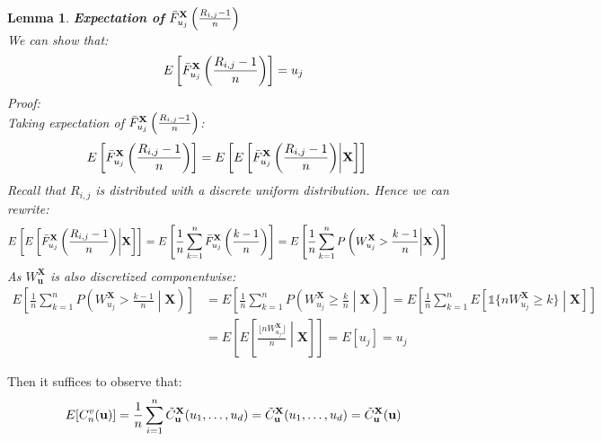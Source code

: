 \documentclass[12pt]{report}
\newtheorem{lemma}{Lemma}[subsection]
\newcommand{\1}{\mathbf{1}}
\begin{document}
\begin{flushleft}
\begin{lemma}\label{componentequalsu_j}
\textit{\normalfont\parencite{KojadinovicYi2024Smooth}}\:
\textbf{Expectation of} $\Bar{F}_{u_{j}}^{\textbf{X}}\left(\frac{R_{i,j} - 1}{n}\right)$ \\
We can show that: 
\begin{align*}
E \left[ \Bar{F}_{u_{j}}^{\textbf{X}}\left(\frac{R_{i,j} - 1}{n}\right) \right] = u_{j}
\end{align*}
Proof:\\
Taking expectation of $\Bar{F}_{u_{j}}^{\textbf{X}}\left(\frac{R_{i,j} - 1}{n}\right)$:
\begin{align*}
E \left[ \Bar{F}_{u_{j}}^{\textbf{X}}\left(\frac{R_{i,j} - 1}{n}\right) \right] &= E \left[ E \left[ \Bar{F}_{u_{j}}^{\textbf{X}}\left(\frac{R_{i,j} - 1}{n}\right) \middle| \textbf{X} \right] \right]
\end{align*}
Recall that $R_{i,j}$ is distributed with a discrete uniform distribution. Hence we can rewrite:
\begin{align*}
E \left[ E \left[ \Bar{F}_{u_{j}}^{\textbf{X}}\left(\frac{R_{i,j} - 1}{n}\right) \middle| \textbf{X} \right] \right] &= E \left[ \frac{1}{n} \sum\limits_{k = 1}^{n} \Bar{F}_{u_{j}}^{\textbf{X}}\left(\frac{k - 1}{n}\right) \right] = E \left[ \frac{1}{n} \sum\limits_{k = 1}^{n} P \left( W^{\textbf{X}}_{u_{j}} > \frac{k - 1}{n} \middle| \textbf{X} \right) \right]
\end{align*}
As $W^{\textbf{X}}_{\textbf{u}}$ is also discretized componentwise:
\begin{align*}
E \left[ \frac{1}{n} \sum\limits_{k = 1}^{n} P \left( W^{\textbf{X}}_{u_{j}} > \frac{k - 1}{n} \middle| \textbf{X} \right) \right] &= E \left[ \frac{1}{n} \sum\limits_{k = 1}^{n} P \left( W^{\textbf{X}}_{u_{j}} \ge \frac{k}{n} \middle| \textbf{X} \right) \right] = E \left[ \frac{1}{n} \sum\limits_{k = 1}^{n} E \left[ \mathds{1}\{ nW^{\textbf{X}}_{u_{j}} \ge k \} \middle| \textbf{X} \right] \right] \\ &= E \left[ E \left[ \frac{\lfloor nW^{\textbf{X}}_{u_{j}} \rfloor}{n} \middle| \textbf{X} \right] \right] = E \left[ u_{j} \right] = u_{j}
\end{align*}
\end{lemma}

Then it suffices to observe that:
\begin{align*}
E[C_{n}^{v}(\textbf{u})] = \frac{1}{n} \sum\limits_{i = 1}^{n} \Tilde{C}^{\textbf{X}}_{\textbf{u}} ( u_{1}, \dots, u_{d} ) =  \Tilde{C}^{\textbf{X}}_{\textbf{u}} ( u_{1}, \dots, u_{d} ) = \Tilde{C}^{\textbf{X}}_{\textbf{u}} (\textbf{u})
\end{align*}


\end{flushleft}
\end{document}
